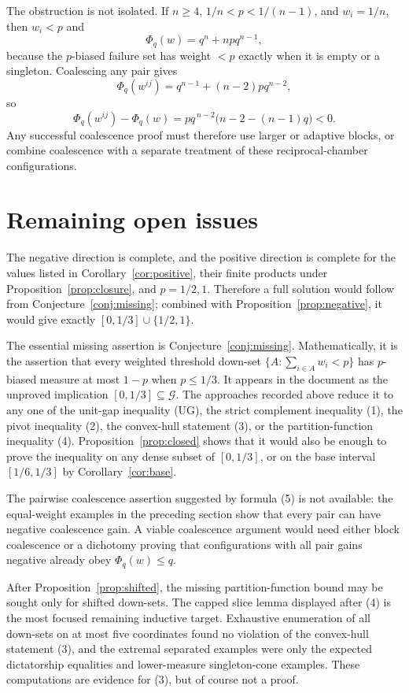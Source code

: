 \documentclass[12pt]{article}
\begin{document}
The obstruction is not isolated.  If \(n\ge4\),
\(1/n<p<1/(n-1)\), and \(w_i=1/n\), then \(w_i<p\) and
\[
 \Phi_q(w)=q^n+npq^{n-1},
\]
because the \(p\)-biased failure set has weight \(<p\) exactly when it is empty
or a singleton.  Coalescing any pair gives
\[
 \Phi_q(w^{ij})=q^{n-1}+(n-2)pq^{n-2},
\]
so
\[
 \Phi_q(w^{ij})-\Phi_q(w)
   =p q^{\,n-2}\bigl(n-2-(n-1)q\bigr)<0 .
\]
Any successful coalescence proof must therefore use larger or adaptive blocks,
or combine coalescence with a separate treatment of these reciprocal-chamber
configurations.
\section*{Remaining open issues}

The negative direction is complete, and the positive direction is complete for
the values listed in Corollary~\ref{cor:positive}, their finite products under
Proposition~\ref{prop:closure}, and \(p=1/2,1\).  Therefore a full solution
would follow from Conjecture~\ref{conj:missing}; combined with
Proposition~\ref{prop:negative}, it would give exactly
\([0,1/3]\cup\{1/2,1\}\).

The essential missing assertion is Conjecture~\ref{conj:missing}.  Mathematically, it
is the assertion that every weighted threshold down-set
\(\{A:\sum_{i\in A}w_i<p\}\) has \(p\)-biased measure at most \(1-p\) when
\(p\le1/3\).  It appears in the document as the unproved implication
\([0,1/3]\subseteq\mathcal G\).  The approaches recorded above reduce it to
any one of the unit-gap inequality (UG), the strict complement inequality (1),
the pivot inequality (2), the convex-hull statement (3), or the
partition-function inequality (4).  Proposition~\ref{prop:closed} shows that it
would also be enough to prove the inequality on any dense subset of
\([0,1/3]\), or on the base interval \([1/6,1/3]\) by
Corollary~\ref{cor:base}.

The pairwise coalescence assertion suggested by formula (5) is not available:
the equal-weight examples in the preceding section show that every pair can have
negative coalescence gain.  A viable coalescence argument would need either block
coalescence or a dichotomy proving that configurations with all pair gains
negative already obey \(\Phi_q(w)\le q\).

After Proposition~\ref{prop:shifted}, the missing partition-function bound may be sought only for shifted down-sets.  The capped slice lemma displayed after (4) is the most focused remaining
inductive target.  Exhaustive enumeration of all down-sets on at most five
coordinates found no violation of the convex-hull statement (3), and the
extremal separated examples were only the expected dictatorship equalities and
lower-measure singleton-cone examples.  These computations are evidence for
(3), but of course not a proof.
\end{document}
